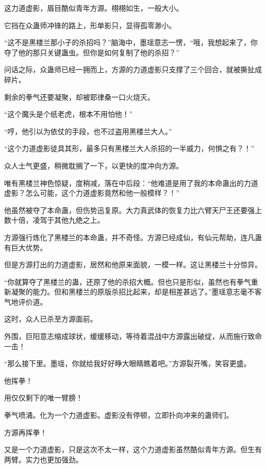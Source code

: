 
\begin{this_body}

这力道虚影，眉目酷似青年方源。栩栩如生，一般大小。

它挡在众蛊师冲锋的路上，形单影只，显得孤零渺小。

“这不是黑楼兰那小子的杀招吗？”脑海中，墨瑶意志一愣，“哦，我想起来了，你夺了他的那只关键蛊虫。但你是如何复制了他的杀招？”

问话之际，众蛊师已经一拥而上，方源的力道虚影只支撑了三个回合，就被撕扯成碎片。

剩余的拳气还要凝聚，却被耶律桑一口火烧灭。

“这个魔头是个纸老虎，根本不用怕他！”

“哼，他引以为依仗的手段，也不过盗用黑楼兰大人。”

“这个力道虚影徒具其形，最多只有黑楼兰大人杀招的一半威力，何惧之有？！”

众人士气更盛，稍微耽搁了一下，以更快的度冲向方源。

唯有黑楼兰神色惊疑，度稍减，落在中后段：“他难道是用了我的本命蛊出的力道虚影？怎么可能，这个力道虚影竟然和他一般模样？！”

他虽然被夺了本命蛊，但伤势迅复原。大力真武体的恢复力比六臂天尸王还要强上数十倍，凌驾于其他九绝之上。

方源强行炼化了黑楼兰的本命蛊，并不奇怪。方源已经成仙，有仙元帮助，连凡蛊有巨大优势。

但是方源打出的力道虚影，居然和他原来面貌，一模一样。这让黑楼兰十分惊异。

“你就算夺了黑楼兰的蛊，还原了他的杀招大概。但也只是形似，虽然也有拳气重新凝聚的能力。但和黑楼兰的原版杀招比起来，却是相差甚远了。”墨瑶意志毫不客气地评价道。

这时，众人已杀至方源面前。

外围，巨阳意志缩成球状，缓缓移动，等待着混战中方源露出破绽，从而施行致命一击！

“那么接下里。墨瑶，你就给我好好睁大眼睛瞧着吧。”方源裂开嘴，笑容更盛。

他挥拳！

用仅仅剩下的唯一臂膀！

拳气喷涌。化为一个力道虚影。虚影没有停顿，立即扑向冲来的蛊师们。

方源再挥拳！

又是一个力道虚影，只是这次不太一样，这个力道虚影虽然酷似青年方源。但生有两臂。实力也更加强劲。


\end{this_body}
